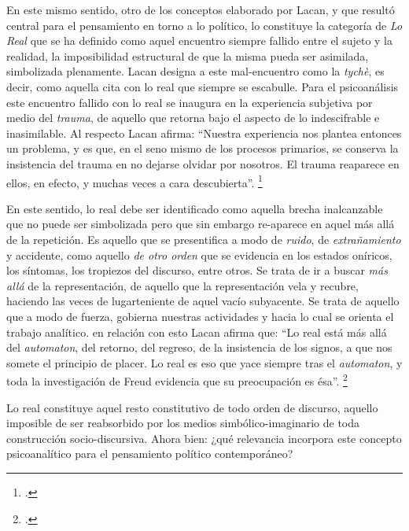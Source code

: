 En este mismo sentido, otro de los conceptos elaborado por Lacan, y que resultó central para el pensamiento en torno a lo político, lo constituye la categoría de \emph{Lo Real} que se ha definido como aquel encuentro siempre fallido entre el sujeto y la realidad, la imposibilidad estructural de que la misma pueda ser asimilada, simbolizada plenamente. Lacan designa a este mal-encuentro como la \emph{tychè}, es decir, como aquella cita con lo real que siempre se escabulle. Para el psicoanálisis este encuentro fallido con lo real se inaugura en la experiencia subjetiva por medio del \emph{trauma}, de aquello que retorna bajo el aspecto de lo indescifrable e inasimilable. Al respecto Lacan afirma: \enquote{Nuestra experiencia nos plantea entonces un problema, y es que, en el seno mismo de los procesos primarios, se conserva la insistencia del trauma en no dejarse olvidar por nosotros. El trauma reaparece en ellos, en efecto, y muchas veces a cara descubierta}. \footcite[][63]{@7106-LACAN2006}

En este sentido, lo real debe ser identificado como aquella brecha inalcanzable que no puede ser simbolizada pero que sin embargo re-aparece en aquel más allá de la repetición. Es aquello que se presentifica a modo de \emph{ruido}, de \emph{extrañamiento} y accidente, como aquello \emph{de otro orden} que se evidencia en los estados oníricos, los síntomas, los tropiezos del discurso, entre otros. Se trata de ir a buscar \emph{más allá} de la representación, de aquello que la representación vela y recubre, haciendo las veces de lugarteniente de aquel vacío subyacente. Se trata de aquello que a modo de fuerza, gobierna nuestras actividades y hacia lo cual se orienta el trabajo analítico. en relación con esto Lacan afirma que: \enquote{Lo real está más allá del \emph{automaton}, del retorno, del regreso, de la insistencia de los signos, a que nos somete el principio de placer. Lo real es eso que yace siempre tras el \emph{automaton}, y toda la investigación de Freud evidencia que su preocupación es ésa}. \footcite[][62]{@7106-LACAN2006}

Lo real constituye aquel resto constitutivo de todo orden de discurso, aquello imposible de ser reabsorbido por los medios simbólico-imaginario de toda construcción socio-discursiva. Ahora bien: ¿qué relevancia incorpora este concepto psicoanalítico para el pensamiento político contemporáneo?

